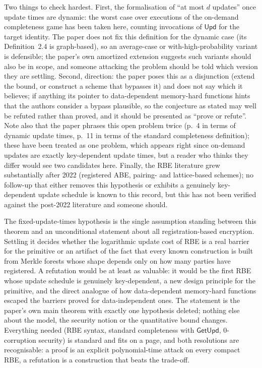 \documentclass{aicr-conjecture}
\newcommand{\Upd}{\mathsf{Upd}}
\newcommand{\GetUpd}{\mathsf{GetUpd}}
\begin{document}
\begin{remark}\label{rem:caveats}
Two things to check hardest. First, the formalisation of ``at most $d$
updates'' once update times are dynamic: the worst case over executions
of the on-demand completeness game has been taken here, counting
invocations of $\Upd$ for the target identity. The paper does not fix
this definition for the dynamic case (its Definition~2.4 is
graph-based), so an average-case or with-high-probability variant is
defensible; the paper's own amortized extension suggests such variants
should also be in scope, and someone attacking the problem should be
told which version they are settling. Second, direction: the paper poses
this as a disjunction (extend the bound, or construct a scheme that
bypasses it) and does not say which it believes; if anything its pointer
to data-dependent memory-hard functions hints that the authors consider
a bypass plausible, so the conjecture as stated may well be refuted
rather than proved, and it should be presented as ``prove or refute''.
Note also that the paper phrases this open problem twice (p.~4 in terms
of dynamic update times, p.~11 in terms of the standard completeness
definition); these have been treated as one problem, which appears
right since on-demand updates are exactly key-dependent update times,
but a reader who thinks they differ would see two candidates here.
Finally, the RBE literature grew substantially after 2022 (registered
ABE, pairing- and lattice-based schemes); no follow-up that either
removes this hypothesis or exhibits a genuinely key-dependent update
schedule is known to this record, but this has not been verified
against the post-2022 literature and someone should.
\end{remark}

\begin{remark}\label{rem:interest}
The fixed-update-times hypothesis is the single assumption standing
between this theorem and an unconditional statement about all
registration-based encryption. Settling it decides whether the
logarithmic update cost of RBE is a real barrier for the primitive or an
artifact of the fact that every known construction is built from Merkle
forests whose shape depends only on how many parties have registered. A
refutation would be at least as valuable: it would be the first RBE
whose update schedule is genuinely key-dependent, a new design principle
for the primitive, and the direct analogue of how data-dependent
memory-hard functions escaped the barriers proved for data-independent
ones. The statement is the paper's own main theorem with exactly one
hypothesis deleted; nothing else about the model, the security notion or
the quantitative bound changes. Everything needed (RBE syntax, standard
completeness with $\GetUpd$, $0$-corruption security) is standard and
fits on a page, and both resolutions are recognisable: a proof is an
explicit polynomial-time attack on every compact RBE, a refutation is a
construction that beats the trade-off.
\end{remark}
\end{document}
